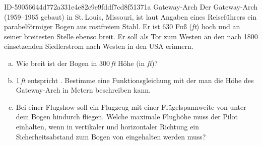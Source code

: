 \begin{exercise}
      {ID-59056644d772a331e4e82c9e9fddf7cd8f51371a}
      {Gateway-Arch}
  \ifproblem\problem
    Der Gateway-Arch (1959--1965 gebaut) in St.\,Louis, Missouri, ist laut
    Angaben eines Reiseführers ein parabelförmiger Bogen aus rostfreiem
    Stahl. Er ist 630 Fuß (\emph{ft}) hoch und an seiner breitesten Stelle
    ebenso breit. Er soll als \glqq{}Tor zum Westen\grqq{} an den nach 1800
    einsetzenden Siedlerstrom nach Westen in den USA erinnern.
    \begin{enumerate}[a)]
      \item Wie breit ist der Bogen in 300\,\emph{ft} Höhe (in \emph{ft})?
      \item 1\,\emph{ft} entspricht . Bestimme eine
            Funktionsgleichung mit der man die Höhe des Gateway-Arch in Metern
            beschreiben kann.
      \item Bei einer Flugshow soll ein Flugzeug mit einer Flügelspannweite
            von  unter dem Bogen hindurch fliegen. Welche maximale
            Flughöhe muss der Pilot einhalten, wenn in vertikaler und horizontaler
            Richtung ein Sicherheitsabstand zum Bogen von  eingehalten
            werden muss?
    \end{enumerate}
  \fi
\end{exercise}
